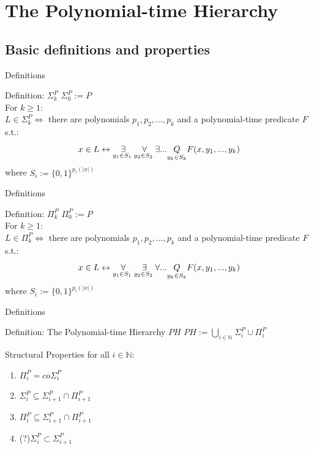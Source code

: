 \section{The Polynomial-time Hierarchy}
    \subsection{Basic definitions and properties}
        \begin{frame}{Definitions}
            \begin{block}{Definition: $\Sigma_k^P$}
                $ \Sigma_0^P := P$\\
                For $k\geq 1:$ \\
                $L \in \Sigma_k^P \iff $ there are polynomials $p_1, p_2,..., p_k$ and a polynomial-time predicate $F$ s.t.:
                $$x \in L \leftrightarrow 
                    \overset{{}}{\underset{{y_1 \in S_1\text{ }}}{\Large \exists}}
                    \overset{{}}{\underset{{y_2 \in S_2\text{ }}}{\Large \forall}}
                    \exists ...\underset{y_k \in S_k}{Q} F(x,y_1,...,y_k)$$
                where $S_i := \{0,1\}^{p_i(|x|)}$  
            \end{block}
        \end{frame}
        \begin{frame}{Definitions}
            \begin{block}{Definition: $\Pi_k^P$}
                $ \Pi_0^P := P$\\
                For $k\geq 1:$ \\
                $L \in \Pi_k^P \iff $ there are polynomials $p_1, p_2,..., p_k$ and a polynomial-time predicate $F$ s.t.:
                $$x \in L \leftrightarrow 
                    \overset{{}}{\underset{{y_1 \in S_1\text{ }}}{\Large \forall}}
                    \overset{{}}{\underset{{y_2 \in S_2\text{ }}}{\Large \exists}}
                    \forall ...\underset{y_k \in S_k}{Q} F(x,y_1,...,y_k)$$
                where $S_i := \{0,1\}^{p_i(|x|)}$  
            \end{block}
        \end{frame}

        
        \begin{frame}{Definitions}
            \begin{block}{Definition: The Polynomial-time Hierarchy $PH$}
            $PH := \bigcup_{i \in \mathbb{N}} \Sigma_i^P \cup \Pi_i^P $
            \end{block}
        \end{frame}
    
        \begin{frame}{Structural Properties}  
            for all $i\in \mathbb{N}$: 
            \begin{enumerate}
                \item $\Pi_i^P = co\Sigma_i^P $
                \pause
                \item $\Sigma_i^P \subseteq \Sigma_{i+1}^P \cap \Pi_{i+1}^P$
                \item $\Pi_i^P \subseteq \Sigma_{i+1}^P \cap \Pi_{i+1}^P$
                \pause
                \item (?)$\Sigma_i^P \subset \Sigma_{i+1}^P$
            \end{enumerate}
        \end{frame}

